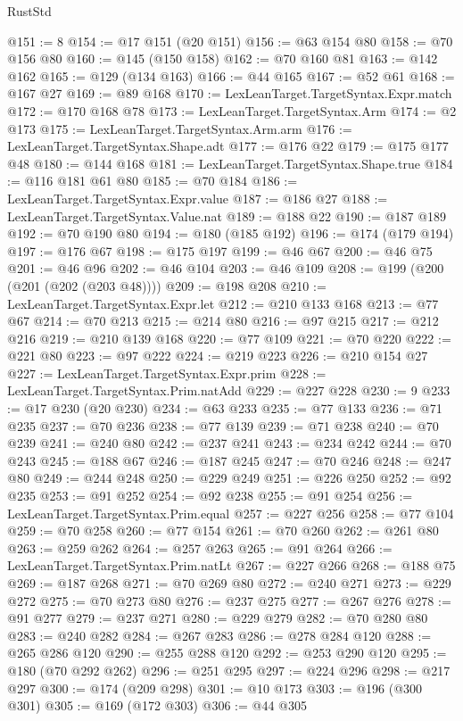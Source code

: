 \begin{lexlean}{RustStd}
\begin{coremodule}
@151 := 8
@154 := @17 @151 (@20 @151)
@156 := @63 @154 @80
@158 := @70 @156 @80
@160 := @145 (@150 @158)
@162 := @70 @160 @81
@163 := @142 @162
@165 := @129 (@134 @163)
@166 := @44 @165
@167 := @52 @61
@168 := @167 @27
@169 := @89 @168
@170 := LexLeanTarget.TargetSyntax.Expr.match
@172 := @170 @168 @78
@173 := LexLeanTarget.TargetSyntax.Arm
@174 := @2 @173
@175 := LexLeanTarget.TargetSyntax.Arm.arm
@176 := LexLeanTarget.TargetSyntax.Shape.adt
@177 := @176 @22
@179 := @175 @177 @48
@180 := @144 @168
@181 := LexLeanTarget.TargetSyntax.Shape.true
@184 := @116 @181 @61 @80
@185 := @70 @184
@186 := LexLeanTarget.TargetSyntax.Expr.value
@187 := @186 @27
@188 := LexLeanTarget.TargetSyntax.Value.nat
@189 := @188 @22
@190 := @187 @189
@192 := @70 @190 @80
@194 := @180 (@185 @192)
@196 := @174 (@179 @194)
@197 := @176 @67
@198 := @175 @197
@199 := @46 @67
@200 := @46 @75
@201 := @46 @96
@202 := @46 @104
@203 := @46 @109
@208 := @199 (@200 (@201 (@202 (@203 @48))))
@209 := @198 @208
@210 := LexLeanTarget.TargetSyntax.Expr.let
@212 := @210 @133 @168
@213 := @77 @67
@214 := @70 @213
@215 := @214 @80
@216 := @97 @215
@217 := @212 @216
@219 := @210 @139 @168
@220 := @77 @109
@221 := @70 @220
@222 := @221 @80
@223 := @97 @222
@224 := @219 @223
@226 := @210 @154 @27
@227 := LexLeanTarget.TargetSyntax.Expr.prim
@228 := LexLeanTarget.TargetSyntax.Prim.natAdd
@229 := @227 @228
@230 := 9
@233 := @17 @230 (@20 @230)
@234 := @63 @233
@235 := @77 @133
@236 := @71 @235
@237 := @70 @236
@238 := @77 @139
@239 := @71 @238
@240 := @70 @239
@241 := @240 @80
@242 := @237 @241
@243 := @234 @242
@244 := @70 @243
@245 := @188 @67
@246 := @187 @245
@247 := @70 @246
@248 := @247 @80
@249 := @244 @248
@250 := @229 @249
@251 := @226 @250
@252 := @92 @235
@253 := @91 @252
@254 := @92 @238
@255 := @91 @254
@256 := LexLeanTarget.TargetSyntax.Prim.equal
@257 := @227 @256
@258 := @77 @104
@259 := @70 @258
@260 := @77 @154
@261 := @70 @260
@262 := @261 @80
@263 := @259 @262
@264 := @257 @263
@265 := @91 @264
@266 := LexLeanTarget.TargetSyntax.Prim.natLt
@267 := @227 @266
@268 := @188 @75
@269 := @187 @268
@271 := @70 @269 @80
@272 := @240 @271
@273 := @229 @272
@275 := @70 @273 @80
@276 := @237 @275
@277 := @267 @276
@278 := @91 @277
@279 := @237 @271
@280 := @229 @279
@282 := @70 @280 @80
@283 := @240 @282
@284 := @267 @283
@286 := @278 @284 @120
@288 := @265 @286 @120
@290 := @255 @288 @120
@292 := @253 @290 @120
@295 := @180 (@70 @292 @262)
@296 := @251 @295
@297 := @224 @296
@298 := @217 @297
@300 := @174 (@209 @298)
@301 := @10 @173
@303 := @196 (@300 @301)
@305 := @169 (@172 @303)
@306 := @44 @305

\end{coremodule}
\end{lexlean}
